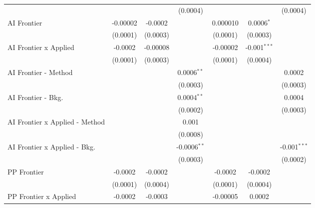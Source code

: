 \begin{tabular}{lcccccc}
                                  &                &                & (0.0004)       &           &                & (0.0004)\\   
   AI Frontier                    & -0.00002       & -0.0002        &                & 0.000010  & 0.0006$^{*}$   &   \\   
                                  & (0.0001)       & (0.0003)       &                & (0.0001)  & (0.0003)       &   \\   
   AI Frontier x Applied          & -0.0002        & -0.00008       &                & -0.00002  & -0.001$^{***}$ &   \\   
                                  & (0.0001)       & (0.0003)       &                & (0.0001)  & (0.0004)       &   \\   
   AI Frontier - Method           &                &                & 0.0006$^{**}$  &           &                & 0.0002\\   
                                  &                &                & (0.0003)       &           &                & (0.0003)\\   
   AI Frontier - Bkg.             &                &                & 0.0004$^{**}$  &           &                & 0.0004\\   
                                  &                &                & (0.0002)       &           &                & (0.0003)\\   
   AI Frontier x Applied - Method &                &                & 0.001          &           &                &   \\   
                                  &                &                & (0.0008)       &           &                &   \\   
   AI Frontier x Applied - Bkg.   &                &                & -0.0006$^{**}$ &           &                & -0.001$^{***}$\\   
                                  &                &                & (0.0003)       &           &                & (0.0002)\\   
   PP Frontier                    & -0.0002        & -0.0002        &                & -0.0002   & -0.0002        &   \\   
                                  & (0.0001)       & (0.0004)       &                & (0.0001)  & (0.0004)       &   \\   
   PP Frontier x Applied          & -0.0002        & -0.0003        &                & -0.00005  & 0.0002         &   \\   

\end{tabular}
